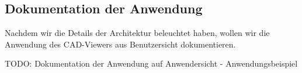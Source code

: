 \subsection{Dokumentation der Anwendung}
\label{subsec:documentation}

Nachdem wir die Details der Architektur beleuchtet haben, wollen wir die Anwendung des CAD-Viewers aus Benutzersicht dokumentieren.

TODO: Dokumentation der Anwendung auf Anwendersicht - Anwendungsbeispiel

